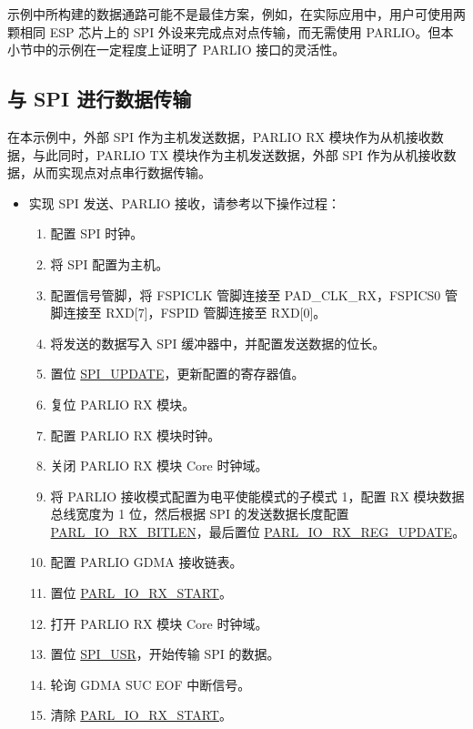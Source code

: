 \documentclass[main\_\_CN.tex]{subfiles}
\begin{document}
\begin{tiplisting}
示例中所构建的数据通路可能不是最佳方案，例如，在实际应用中，用户可使用两颗相同 ESP 芯片上的 SPI 外设来完成点对点传输，而无需使用 PARLIO。但本小节中的示例在一定程度上证明了 PARLIO 接口的灵活性。\end{tiplisting}

\subsection{与 SPI 进行数据传输}

在本示例中，外部 SPI 作为主机发送数据，PARLIO RX 模块作为从机接收数据，与此同时，PARLIO TX 模块作为主机发送数据，外部 SPI 作为从机接收数据，从而实现点对点串行数据传输。

\begin{itemize}
    \item 实现 SPI 发送、PARLIO 接收，请参考以下操作过程：
    \begin{enumerate}
        \item 配置 SPI 时钟。
        \item 将 SPI 配置为主机。
        \item 配置信号管脚，将 FSPICLK 管脚连接至 PAD\_CLK\_RX，FSPICS0 管脚连接至 RXD[7]，FSPID 管脚连接至 RXD[0]。 
        \item 将发送的数据写入 SPI 缓冲器中，并配置发送数据的位长。
        \item 置位 \hyperref[fielddesc:SPIUPDATE]{SPI\_UPDATE}，更新配置的寄存器值。
        \item 复位 PARLIO RX 模块。
        \item 配置 PARLIO RX 模块时钟。
        \item 关闭 PARLIO RX 模块 Core 时钟域。
        \item 将 PARLIO 接收模式配置为电平使能模式的子模式 1，配置 RX 模块数据总线宽度为 1 位，然后根据 SPI 的发送数据长度配置 \hyperref[fielddesc:PARLIORXBITLEN]{PARL\_IO\_RX\_BITLEN}，最后置位 \hyperref[fielddesc:PARLIORXREGUPDATE]{PARL\_IO\_RX\_REG\_UPDATE}。
        \item 配置 PARLIO GDMA 接收链表。
        \item 置位 \hyperref[fielddesc:PARLIORXSTART]{PARL\_IO\_RX\_START}。
        \item 打开 PARLIO RX 模块 Core 时钟域。
        \item 置位 \hyperref[fielddesc:SPIUSR]{SPI\_USR}，开始传输 SPI 的数据。
        \item 轮询 GDMA SUC EOF 中断信号。
        \item 清除 \hyperref[fielddesc:PARLIORXSTART]{PARL\_IO\_RX\_START}。

\end{enumerate}
\end{itemize}
\end{document}
